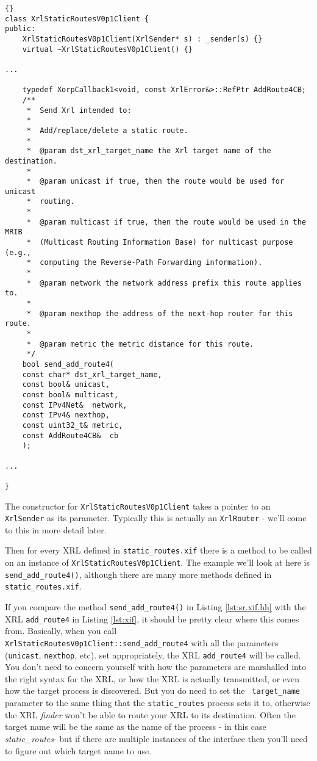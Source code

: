 \documentclass[11pt]{article}
\newcommand{\stt}{\tt\small}
\newcommand{\SR}{{\tt\small static\_routes}\xspace}
\newcommand{\SRI}{{\it static\_routes}\xspace}
\begin{document}
\begin{lstlisting}[caption={ Fragment from {\stt xorp/xrl/interfaces/static\_routes\_xif.hh} %
                                     \label{lst:sr.xif.hh} } ]{}
class XrlStaticRoutesV0p1Client {
public:
    XrlStaticRoutesV0p1Client(XrlSender* s) : _sender(s) {}
    virtual ~XrlStaticRoutesV0p1Client() {}

...

    typedef XorpCallback1<void, const XrlError&>::RefPtr AddRoute4CB;
    /**
     *  Send Xrl intended to:
     *
     *  Add/replace/delete a static route.
     *
     *  @param dst_xrl_target_name the Xrl target name of the destination.
     *
     *  @param unicast if true, then the route would be used for unicast
     *  routing.
     *
     *  @param multicast if true, then the route would be used in the MRIB
     *  (Multicast Routing Information Base) for multicast purpose (e.g.,
     *  computing the Reverse-Path Forwarding information).
     *
     *  @param network the network address prefix this route applies to.
     *
     *  @param nexthop the address of the next-hop router for this route.
     *
     *  @param metric the metric distance for this route.
     */
    bool send_add_route4(
	const char*	dst_xrl_target_name,
	const bool&	unicast,
	const bool&	multicast,
	const IPv4Net&	network,
	const IPv4&	nexthop,
	const uint32_t&	metric,
	const AddRoute4CB&	cb
    );

...

}
\end{lstlisting}
\newpage
The constructor for {\stt XrlStaticRoutesV0p1Client} takes a pointer to
an {\stt XrlSender} as its parameter.  Typically this is actually an
{\stt XrlRouter} - we'll come to this in more detail later.

Then for every XRL defined in {\stt static\_routes.xif} there is a
method to be called on an instance of {\stt XrlStaticRoutesV0p1Client}.
The example we'll look at here is {\stt send\_add\_route4()}, although
there are many more methods defined in {\stt static\_routes.xif}.

If you compare the method {\stt send\_add\_route4()} in Listing
\ref{lst:sr.xif.hh} with the XRL {\stt add\_route4} in Listing
\ref{lst:xif}, it should be pretty clear where this comes from.
Basically, when you call \\
{\stt XrlStaticRoutesV0p1Client::send\_add\_route4} with all the
parameters ({\stt unicast}, {\stt nexthop}, etc).  set appropriately,
the XRL {\stt add\_route4} will be called.  You don't need to concern
yourself with how the parameters are marshalled into the right syntax
for the XRL, or how the XRL is actually transmitted, or even how the
target process is discovered.  But you do need to set the {\stt
target\_name} parameter to the same thing that the \SR process sets it
to, otherwise the XRL {\it finder} won't be able to route your XRL to
its destination.  Often the target name will be the same as the name
of the process - in this case \SRI - but if there are multiple
instances of the interface then you'll need to figure out which target
name to use.
\end{document}
